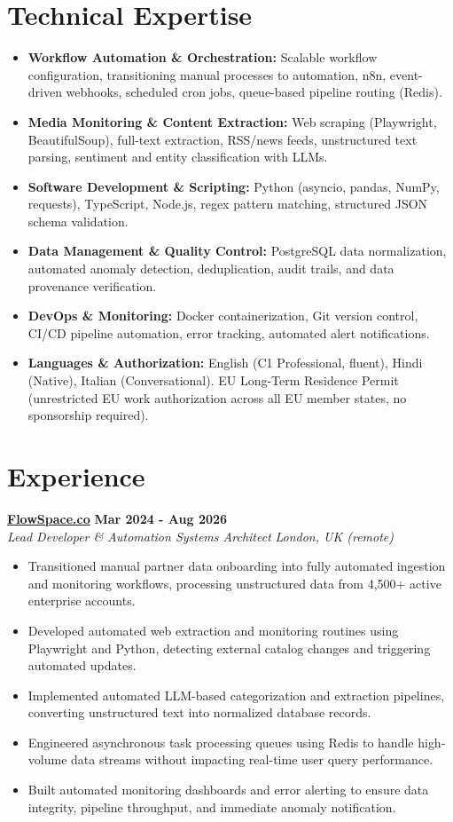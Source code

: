 \documentclass[10pt,a4paper]{article}
\newcommand{\role}[4]{%
  \textbf{#1} \hfill \textbf{#2}\\[1pt]%
  \textit{#3} \hfill \textit{#4}\\[2pt]%
}
\begin{document}
\section{Technical Expertise}
\begin{itemize}
  \item \textbf{Workflow Automation \& Orchestration:} Scalable workflow configuration, transitioning manual processes to automation, n8n, event-driven webhooks, scheduled cron jobs, queue-based pipeline routing (Redis).
  \item \textbf{Media Monitoring \& Content Extraction:} Web scraping (Playwright, BeautifulSoup), full-text extraction, RSS/news feeds, unstructured text parsing, sentiment and entity classification with LLMs.
  \item \textbf{Software Development \& Scripting:} Python (asyncio, pandas, NumPy, requests), TypeScript, Node.js, regex pattern matching, structured JSON schema validation.
  \item \textbf{Data Management \& Quality Control:} PostgreSQL data normalization, automated anomaly detection, deduplication, audit trails, and data provenance verification.
  \item \textbf{DevOps \& Monitoring:} Docker containerization, Git version control, CI/CD pipeline automation, error tracking, automated alert notifications.
  \item \textbf{Languages \& Authorization:} English (C1 Professional, fluent), Hindi (Native), Italian (Conversational). EU Long-Term Residence Permit (unrestricted EU work authorization across all EU member states, no sponsorship required).
\end{itemize}

\section{Experience}

\role{\href{https://flowspace.co}{FlowSpace.co}}{Mar 2024 - Aug 2026}{Lead Developer \& Automation Systems Architect}{London, UK (remote)}
\begin{itemize}
  \item Transitioned manual partner data onboarding into fully automated ingestion and monitoring workflows, processing unstructured data from 4,500+ active enterprise accounts.
  \item Developed automated web extraction and monitoring routines using Playwright and Python, detecting external catalog changes and triggering automated updates.
  \item Implemented automated LLM-based categorization and extraction pipelines, converting unstructured text into normalized database records.
  \item Engineered asynchronous task processing queues using Redis to handle high-volume data streams without impacting real-time user query performance.
  \item Built automated monitoring dashboards and error alerting to ensure data integrity, pipeline throughput, and immediate anomaly notification.
\end{itemize}
\end{document}
